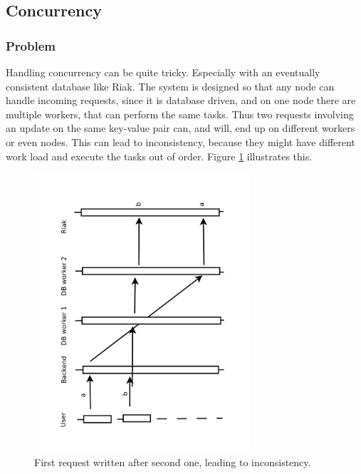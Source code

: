 \documentclass[11pt,a4paper]{report}
\begin{document}
\subsection{Concurrency}
\label{sec:concurrency}
\subsubsection{Problem}
Handling concurrency can be quite tricky.
Especially with an eventually consistent database like Riak.
The system is designed so that any node can handle incoming requests,
since it is database driven, and on one node there are multiple workers,
that can perform the same tasks.
Thus two requests involving an update on the same key-value pair can, and will,
end up on different workers or even nodes.
This can lead to inconsistency, because they might have different work load
and execute the tasks out of order.
Figure \ref{fig:concurrency:problem_expl} illustrates this.
\begin{figure}[htbp!]
 \centering
 \includegraphics[width=8cm, angle=-90]{./graphics/Concurrency_-_Earlier_session_write_replace_later_session_write.pdf}
 \vspace{-1cm}
 \caption{First request written after second one, leading to inconsistency.}
 \label{fig:concurrency:problem_expl}
\end{figure}
\end{document}
